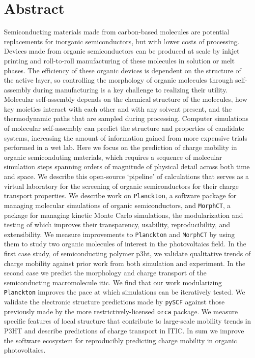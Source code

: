 
\chapter*{Abstract}

Semiconducting materials made from carbon-based molecules are potential replacements for inorganic semiconductors, but with lower costs of processing.
Devices made from organic semiconductors can be produced at scale by inkjet printing and roll-to-roll manufacturing of these molecules in solution or melt phases.  
The efficiency of these organic devices is dependent on the structure of the active layer, so controlling the morphology of organic molecules through self-assembly during manufacturing is a key challenge to realizing their utility.
Molecular self-assembly depends on the chemical structure of the molecules, how key moieties interact with each other and with any solvent present, and the thermodynamic paths that are sampled during processing.
Computer simulations of molecular self-assembly can predict the structure and properties of candidate systems, increasing the amount of information gained from more expensive trials performed in a wet lab.
Here we focus on the prediction of charge mobility in organic semiconduting materials,
which requires a sequence of molecular simulation steps spanning orders of magnitude of physical detail across both time and space.
We describe this open-source `pipeline' of calculations that serves as a virtual laboratory for the screening of organic semiconductors for their charge transport properties.
We describe work on \texttt{Planckton}, a software package for managing molecular simulations of organic semiconductors, and \texttt{MorphCT},
a package for managing kinetic Monte Carlo simulations, the modularization and testing of which improves their transparency, usability, reproducibility, and extensibility.
We measure improvements to \texttt{Planckton} and \texttt{MorphCT} by using them to study two organic molecules of interest in the photovoltaics field.
In the first case study, of semiconducting polymer \gls{p3ht}, 
we validate qualitative trends of charge mobility against prior work from both simulation and experiment.
In the second case we predict the morphology and charge transport of the semiconducting macromolecule 
\gls{itic}.
We find that our work modularizing \texttt{Planckton} improves the pace at which simulations can be iteratively tested.
We validate the electronic structure predictions made by \texttt{pySCF} against those previously made by the more restrictively-licensed \texttt{orca} package.
We measure specific features of local structure that contribute to large-scale mobility trends in P3HT and describe predictions of charge transport in ITIC.
In sum we improve the software ecosystem for reproducibly predicting charge mobility in organic photovoltaics.

